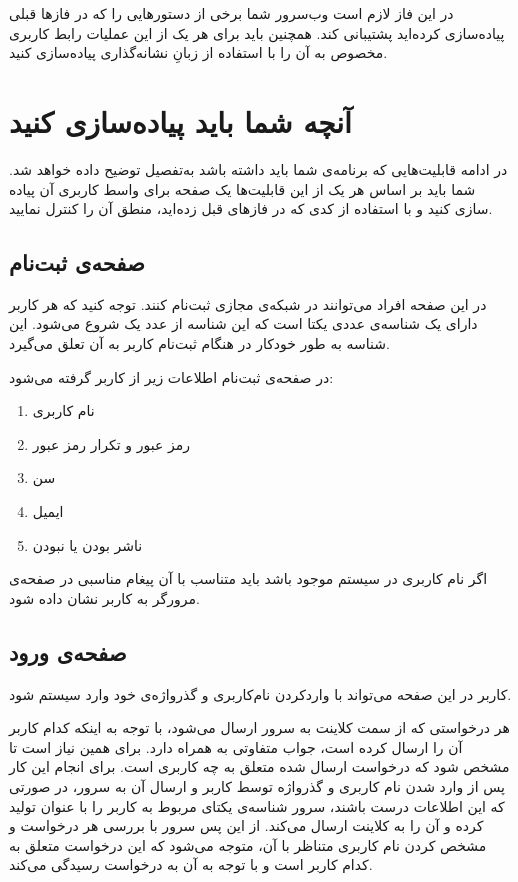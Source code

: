 \documentclass{utap}
\begin{document}
		در این فاز لازم است وب‌سرور شما برخی از دستورهایی را که در فازها قبلی پیادەسازی کردەاید پشتیبانی کند. همچنین باید برای هر یک از این عملیات رابط کاربری مخصوص به آن را با استفاده از زبانِ نشانه‌گذاری  پیادەسازی کنید.

	\section{آنچه‌ شما باید پیاده‌سازی کنید}
	
در ادامه قابلیت‌هایی که برنامه‌ی شما باید داشته باشد به‌تفصیل توضیح داده خواهد شد. شما باید بر اساس هر یک از این قابلیت‌ها یک صفحه برای واسط کاربری آن پیاده سازی کنید و با استفاده از کدی که در فازهای قبل زدەاید، منطق آن را کنترل نمایید.
	
	\subsection{صفحه‌ی ثبت‌نام}
	
	در این صفحه افراد می‌توانند در شبکه‌ی مجازی ثبت‌نام کنند. توجه کنید که هر کاربر دارای یک شناسه‌ی عددی یکتا است که این شناسه از عدد یک شروع می‌شود. این شناسه به طور خودکار در هنگام
ثبت‌نام کاربر به آن تعلق می‌گیرد.  
	
	در صفحه‌ی ثبت‌نام اطلاعات زیر از کاربر گرفته می‌شود‌:‌
	\begin{enumerate}
		\item نام ‌کاربری
		\item رمز عبور و تکرار رمز عبور
		\item سن
		\item ایمیل
		\item ناشر بودن یا نبودن
	\end{enumerate}
	
	اگر نام کاربری در سیستم موجود باشد باید متناسب با آن پیغام مناسبی در صفحه‌ی مرورگر به کاربر نشان داده شود.
	
		
	\subsection{صفحه‌ی ورود}
	کاربر در این صفحه می‌تواند با واردکردن نام‌کاربری و گذرواژەی خود وارد سیستم شود. 
	
	هر درخواستی که از سمت کلاینت به سرور ارسال می‌شود، با توجه به اینکه کدام کاربر آن را ارسال کرده است، جواب متفاوتی به همراه دارد. برای همین نیاز است تا مشخص شود که درخواست ارسال شده متعلق به چه کاربری است. برای انجام این کار پس از وارد شدن نام‌ کاربری و گذرواژه توسط کاربر و ارسال آن به سرور، در صورتی که این اطلاعات درست باشند، سرور شناسه‌ی یکتای مربوط به کاربر را با عنوان  تولید کرده و آن را به کلاینت ارسال می‌کند. از این پس سرور با بررسی  هر درخواست و مشخص کردن نام کاربری متناظر با آن، متوجه می‌شود که این درخواست متعلق به کدام کاربر است و با توجه به آن به درخواست رسیدگی می‌کند.
	
\end{document}
